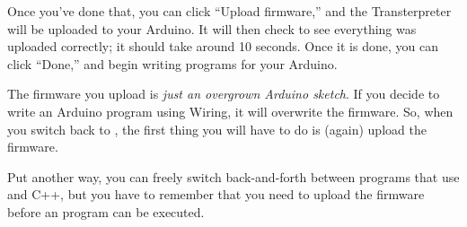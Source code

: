 Once you've done that, you can click ``Upload firmware,'' and the Transterpreter will be uploaded to your Arduino. It will then check to see everything was uploaded correctly; it should take around 10 seconds. Once it is done, you can click ``Done,'' and begin writing \occam programs for your Arduino.

\vspace{1cm}
\begin{warning}
The firmware you upload is {\em just an overgrown Arduino sketch}. If you decide to write an Arduino program using Wiring, it will overwrite the \plumbing firmware. So, when you switch back to \occam, the first thing you will have to do is (again) upload the firmware.
\end{warning}
\vspace{1cm}

Put another way, you can freely switch back-and-forth between programs that use \occam and C++, but you have to remember that you need to upload the firmware before an \occam program can be executed.